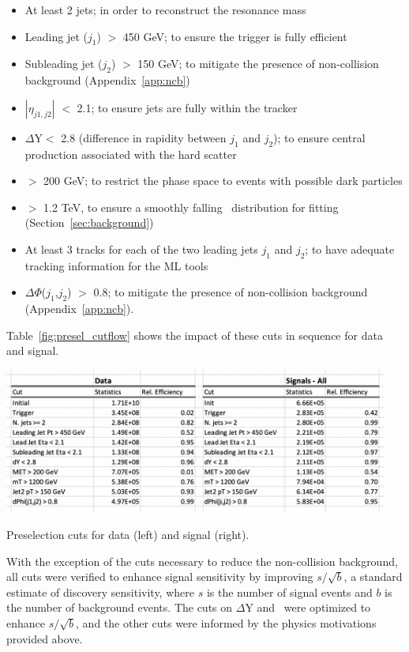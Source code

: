 \begin{itemize}
\item At least 2 jets; in order to reconstruct the resonance mass
\item Leading jet ($j_1$) \pt $>$ 450 GeV; to ensure the trigger is fully efficient
\item Subleading jet ($j_2$) \pt $>$ 150 GeV; to mitigate the presence of non-collision background (Appendix~\ref{app:ncb})
\item $|\eta_{j1,j2}|$ $<$ 2.1; to ensure jets are fully within the tracker
\item $\Delta$Y$<$ 2.8 (difference in rapidity between $j_1$ and $j_2$); to ensure central production associated with the hard scatter  
\item \met $>$ 200 GeV; to restrict the phase space to events with possible dark particles 
\item \mt $>$ 1.2 TeV, to ensure a smoothly falling \mt~distribution for fitting (Section~\ref{sec:background})
\item At least 3 tracks for each of the two leading jets $j_1$ and $j_2$; to have adequate tracking information for the ML tools
\item $\Delta\Phi$($j_1$,$j_2$) $>$ 0.8; to mitigate the presence of non-collision background (Appendix~\ref{app:ncb}).
\end{itemize}

Table~\ref{fig:presel_cutflow} shows the impact of these cuts in sequence for data and signal.
\begin{table}[!htbp]
\centering
   \includegraphics[width=0.95\textwidth]{figures/eventsel/preselection/presel_cutflow}
    \caption{Preselection cuts for data (left) and signal (right).
    \label{fig:presel_cutflow}}
\end{table}

With the exception of the cuts necessary to reduce the non-collision background, all cuts were verified to enhance signal sensitivity by improving $s/\sqrt{b}$, a standard estimate of discovery sensitivity, where $s$ is the number of signal events and $b$ is the number of background events. The cuts on $\Delta$Y and \met~were optimized to enhance $s/\sqrt{b}$, and the other cuts were informed by the physics motivations provided above. \par

